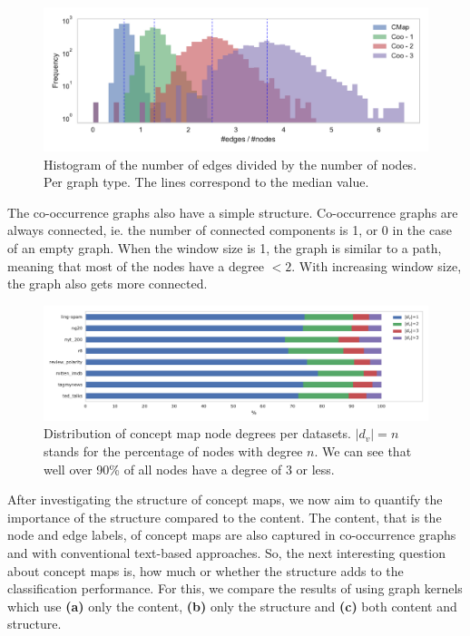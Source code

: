 \begin{figure}[htb!]
\centering
\includegraphics[width=0.7\linewidth]{assets/figures/hist-edgesnodes.pdf}
\caption[Statistics: Histogram of the number of edges divided by the number of nodes]{Histogram of the number of edges divided by the number of nodes. Per graph type. The lines correspond to the median value.}
\label{fig:histogram-edges-div-nodes-per-type}
\end{figure}

The co-occurrence graphs also have a simple structure.
Co-occurrence graphs are always connected, ie. the number of connected components is 1, or 0 in the case of an empty graph.
When the window size is 1, the graph is similar to a path, meaning that most of the nodes have a degree $< 2$. With increasing window size, the graph also gets more connected.

\begin{figure}[htb!]
	\centering
	{\includegraphics[width=\linewidth]{assets/figures/percentage_degree.pdf}%
		\caption[Statistics: Distribution of concept map node degrees]{%
			Distribution of concept map node degrees per datasets. $|d_v| = n$ stands for the percentage of nodes with degree $n$.
			We can see that well over 90\% of all nodes have a degree of $3$ or less.
		}%
		\label{fig:percentage_degree}}
\end{figure}



After investigating the structure of concept maps, we now aim to quantify the importance of the structure compared to the content.
The content, that is the node and edge labels, of concept maps are also captured in co-occurrence graphs and with conventional text-based approaches. So, the next interesting question about concept maps is, how much or whether the structure adds to the classification performance.
For this, we compare the results of using graph kernels which use \textbf{(a)} only the content, \textbf{(b)} only the structure and \textbf{(c)} both content and structure.

